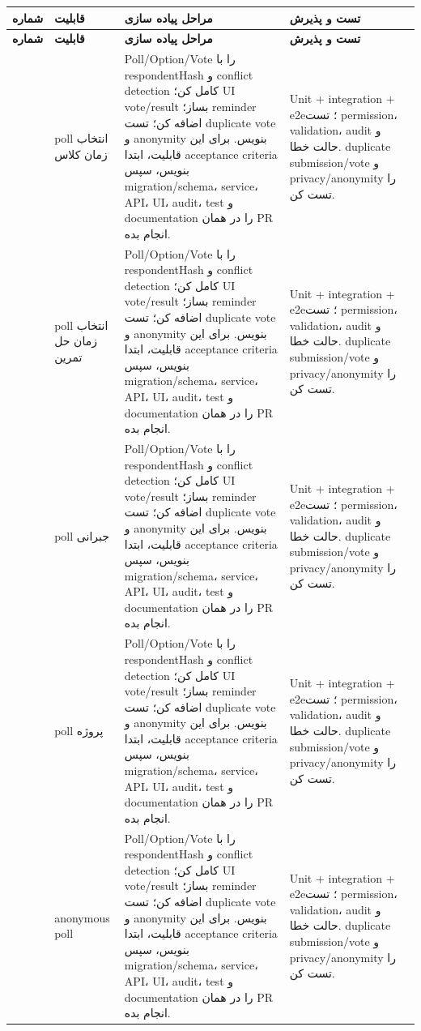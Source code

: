 \documentclass[11pt,a4paper]{article}
\begin{document}
\begin{longtable}{|>{\raggedleft\arraybackslash}p{}|>{\raggedleft\arraybackslash}p{}|>{\raggedleft\arraybackslash}p{}|>{\raggedleft\arraybackslash}p{}|}
\hline
\textbf{شماره} & \textbf{قابلیت} & \textbf{مراحل پیاده سازی} & \textbf{تست و پذیرش} \\\hline
\endfirsthead
\hline
\textbf{شماره} & \textbf{قابلیت} & \textbf{مراحل پیاده سازی} & \textbf{تست و پذیرش} \\\hline
\endhead
181 & poll انتخاب زمان کلاس & Poll/Option/Vote را با respondentHash و conflict detection کامل کن؛ UI vote/result بساز؛ reminder اضافه کن؛ تست duplicate vote و anonymity بنویس. برای این قابلیت، ابتدا acceptance criteria بنویس، سپس migration/schema، service، API، UI، audit، test و documentation را در همان PR انجام بده. & Unit + integration + e2e؛ تست permission، validation، audit و حالت خطا. duplicate submission/vote و privacy/anonymity را تست کن. \\ \hline
182 & poll انتخاب زمان حل تمرین & Poll/Option/Vote را با respondentHash و conflict detection کامل کن؛ UI vote/result بساز؛ reminder اضافه کن؛ تست duplicate vote و anonymity بنویس. برای این قابلیت، ابتدا acceptance criteria بنویس، سپس migration/schema، service، API، UI، audit، test و documentation را در همان PR انجام بده. & Unit + integration + e2e؛ تست permission، validation، audit و حالت خطا. duplicate submission/vote و privacy/anonymity را تست کن. \\ \hline
183 & poll جبرانی & Poll/Option/Vote را با respondentHash و conflict detection کامل کن؛ UI vote/result بساز؛ reminder اضافه کن؛ تست duplicate vote و anonymity بنویس. برای این قابلیت، ابتدا acceptance criteria بنویس، سپس migration/schema، service، API، UI، audit، test و documentation را در همان PR انجام بده. & Unit + integration + e2e؛ تست permission، validation، audit و حالت خطا. duplicate submission/vote و privacy/anonymity را تست کن. \\ \hline
184 & poll پروژه & Poll/Option/Vote را با respondentHash و conflict detection کامل کن؛ UI vote/result بساز؛ reminder اضافه کن؛ تست duplicate vote و anonymity بنویس. برای این قابلیت، ابتدا acceptance criteria بنویس، سپس migration/schema، service، API، UI، audit، test و documentation را در همان PR انجام بده. & Unit + integration + e2e؛ تست permission، validation، audit و حالت خطا. duplicate submission/vote و privacy/anonymity را تست کن. \\ \hline
185 & anonymous poll & Poll/Option/Vote را با respondentHash و conflict detection کامل کن؛ UI vote/result بساز؛ reminder اضافه کن؛ تست duplicate vote و anonymity بنویس. برای این قابلیت، ابتدا acceptance criteria بنویس، سپس migration/schema، service، API، UI، audit، test و documentation را در همان PR انجام بده. & Unit + integration + e2e؛ تست permission، validation، audit و حالت خطا. duplicate submission/vote و privacy/anonymity را تست کن. \\ \hline

\end{longtable}
\end{document}
